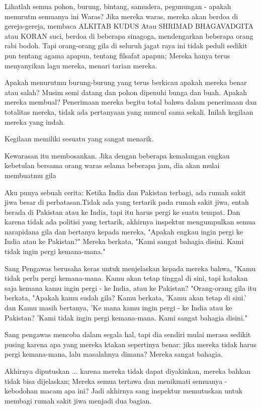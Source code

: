 Lihatlah semua pohon, burung, bintang, samudera, pegunungan - apakah menurutm semuanya ini Waras? Jika mereka waras, mereka akan berdoa di gereja-gereja, membaca ALKITAB KUDUS Atau SHRIMAD BHAGAVADGITA atau KORAN suci, berdoa di beberapa sinagoga, mendengarkan beberapa orang rabi bodoh. Tapi orang-orang gila di seluruh jagat raya ini tidak peduli sedikit pun tentang agama apapun, tentang filsafat apapun; Mereka hanya terus menyanyikan lagu mereka, menari tarian mereka.

Apakah menurutmu burung-burung yang terus berkicau apakah mereka benar atau salah? Musim semi datang dan pohon dipenuhi bunga dan buah. Apakah mereka membual? Penerimaan mereka begitu total bahwa dalam penerimaan dan totalitas mereka, tidak ada pertanyaan yang muncul sama sekali. Inilah kegilaan mereka yang indah.

Kegilaan memiliki sesuatu yang sangat menarik.

Kewarasan itu membosankan. Jika dengan beberapa kemalangan engkau kebetulan bersama orang waras selama beberapa jam, dia akan mulai membuatmu gila

Aku punya sebuah cerita: Ketika India dan Pakistan terbagi, ada rumah sakit jiwa besar di perbatasan.Tidak ada yang tertarik pada rumah sakit jiwa, entah berada di Pakistan atau ke India, tapi itu harus pergi ke suatu tempat. Dan karena tidak ada politisi yang tertarik, akhirnya inspektur mengumpulkan semua narapidana gila dan bertanya kepada mereka, "Apakah engkau ingin pergi ke India atau ke Pakistan?" Mereka berkata, "Kami sangat bahagia disini. Kami tidak ingin pergi kemana-mana."

Sang Pengawas berusaha keras untuk menjelaskan kepada mereka bahwa, "Kamu tidak perlu pergi kemana-mana. Kamu akan tetap tinggal di sini, tapi katakan saja kemana kamu ingin pergi - ke India, atau ke Pakistan? "Orang-orang gila itu berkata, "Apakah kamu sudah gila? Kamu berkata, 'Kamu akan tetap di sini.' dan Kamu masih bertanya, 'Ke mana kamu ingin pergi - ke India atau ke Pakistan? 'Kami tidak ingin pergi kemana-mana. Kami sangat bahagia disini."

Sang pengawas mencoba dalam segala hal, tapi dia sendiri mulai merasa sedikit pusing karena apa yang mereka ktakan sepertinya benar: jika mereka tidak harus pergi kemana-mana, lalu masalahnya dimana? Mereka sangat bahagia.

Akhirnya diputuskan ... karena mereka tidak dapat diyakinkan, mereka bahkan tidak bisa dijelaskan; Mereka semua tertawa dan menikmati semuanya - kebodohan macam apa ini? Jadi akhirnya sang inspektur memutuskan untuk membagi rumah sakit jiwa menjadi dua bagian.

